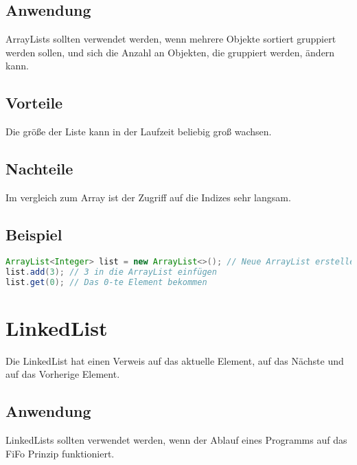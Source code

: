 \subsection{Anwendung}
ArrayLists sollten verwendet werden, wenn mehrere Objekte sortiert gruppiert werden sollen, und sich die Anzahl an Objekten, die gruppiert werden, ändern kann.

\subsection{Vorteile}
Die größe der Liste kann in der Laufzeit beliebig groß wachsen.

\subsection{Nachteile}
Im vergleich zum Array ist der Zugriff auf die Indizes sehr langsam.

\subsection{Beispiel}
\begin{lstlisting}[language=Java, caption={Beispiel für Arrays}]
ArrayList<Integer> list = new ArrayList<>(); // Neue ArrayList erstellen.
list.add(3); // 3 in die ArrayList einfügen
list.get(0); // Das 0-te Element bekommen
\end{lstlisting}

\section{LinkedList}
Die LinkedList hat einen Verweis auf das aktuelle Element, auf das Nächste und auf das Vorherige Element.

\subsection{Anwendung}
LinkedLists sollten verwendet werden, wenn der Ablauf eines Programms auf das \gls{FiFo} Prinzip funktioniert.